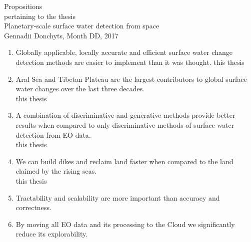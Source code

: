 \documentclass[oneside,10pt]{article}
\begin{document}
\pagestyle{empty}
{
\centering

{\LARGE Propositions \\}
\vspace{0.5cm}
{\large pertaining to the thesis \\}
\vspace{0.5cm}
{\LARGE Planetary-scale surface water detection from space \\ }
\vspace{0.5cm}
{\large Gennadii Donchyts, Month DD, 2017 \\}
}


{
\newcommand{\citat}[1]{\smth \hfill {\small #1}}
\newcommand{\smth}{$\left.\right.$}


\begin{enumerate}

\item Globally applicable, locally accurate and efficient surface water change detection methods are easier to implement than it was thought.
\citat{this thesis}

\item Aral Sea and Tibetan Plateau are the largest contributors to global surface water changes over the last three decades. \\
\citat{this thesis}

\item A combination of discriminative and generative methods provide better results when compared to only discriminative methods of surface water detection from EO data. \\
\citat{this thesis}


\item We can build dikes and reclaim land faster when compared to the land claimed by the rising seas. \\
\citat{this thesis}

\item Tractability and scalability are more important than accuracy and correctness. \\

\item By moving all EO data and its processing to the Cloud we significantly reduce its explorability. \\


\end{enumerate}}
\end{document}

